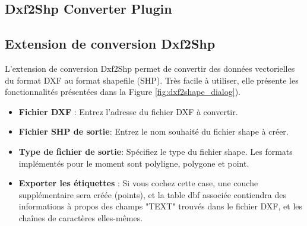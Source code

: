 
\subsection{Dxf2Shp Converter Plugin}
\subsection{Extension de conversion Dxf2Shp}


L'extension de conversion Dxf2Shp permet de convertir des données vectorielles du format DXF au format shapefile (SHP).
Très facile à utiliser, elle présente les fonctionnalités présentées dans la Figure \ref{fig:dxf2shape_dialog}).

\begin{itemize}
\item \textbf{Fichier DXF} : Entrez l'adresse du fichier DXF à convertir.
\item \textbf{Fichier SHP de sortie}: Entrez le nom souhaité du fichier shape à créer.
\item \textbf{Type de fichier de sortie}: Spécifiez le type du fichier shape. Les formats implémentés pour le moment sont polyligne, polygone et point.
\item \textbf{Exporter les étiquettes} : Si vous cochez cette case, une couche supplémentaire sera créée (points), et la table dbf associée contiendra des informations à propos des champs "TEXT" trouvés dans le fichier DXF, et les chaînes de caractères elles-mêmes.
\end{itemize}

